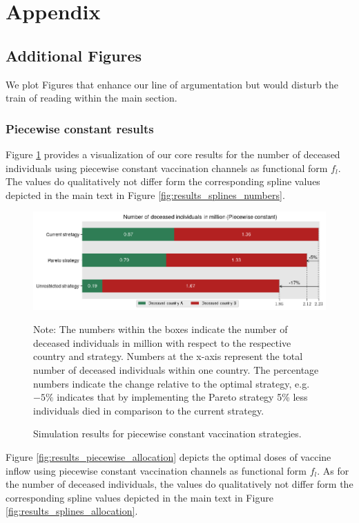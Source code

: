 \appendix
{}
\section{Appendix}

\subsection{Additional Figures}
We plot Figures that enhance our line of argumentation but would disturb the train of reading within the main section.
\subsubsection{Piecewise constant results}
\label{A:piecewise}
Figure \ref{fig:results_piecewise_numbers} provides a visualization of our core results for the number of deceased individuals using piecewise constant vaccination channels as functional form $f_l$. The values do qualitatively not differ form the corresponding spline values depicted in the main text in Figure \ref{fig:results_splines_numbers}.
\begin{figure}[h!]
\centering
\includegraphics[scale=0.65]{images/piecewise_percentage_deviation.png}\\
\begin{flushleft}
\scriptsize{Note: The numbers within the boxes indicate the number of deceased individuals in million with respect to the respective country and strategy. Numbers at the x-axis represent the total number of deceased individuals within one country. The percentage numbers indicate the change relative to the optimal strategy, e.g. $-5\%$ indicates that by implementing the Pareto strategy 5\% less individuals died in comparison to the current strategy.}
\end{flushleft}
\caption{Simulation results for piecewise constant vaccination strategies.}
\label{fig:results_piecewise_numbers}
\end{figure}

Figure \ref{fig:results_piecewise_allocation} depicts the optimal doses of vaccine inflow using piecewise constant vaccination channels as functional form $f_l$. As for the number of deceased individuals, the values do qualitatively not differ form the corresponding spline values depicted in the main text in Figure \ref{fig:results_splines_allocation}.\\

